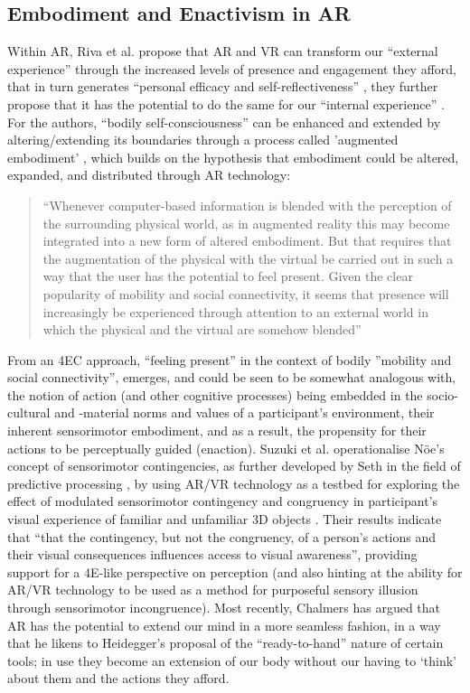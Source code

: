 \subsection{Embodiment and Enactivism in AR}\label{sec: theory-embodimentar}
Within AR, Riva et al. propose that AR and VR can transform our “external experience” through the increased levels of presence and engagement they afford, that in turn generates “personal efficacy and self-reflectiveness” \citeyearpar[p. 10]{riva2016}, they further propose that it has the potential to do the same for our “internal experience” . For the authors, “bodily self-consciousness” can be enhanced and extended by altering/extending its boundaries through a process called ’augmented embodiment’ , which builds on the hypothesis that embodiment could be altered, expanded, and distributed through AR technology: 
\begin{quote}
    “Whenever computer-based information is blended with the perception of the surrounding physical world, as in augmented reality this may become integrated into a new form of altered embodiment. But that requires that the augmentation of the physical with the virtual be carried out in such a way that the user has the potential to feel present. Given the clear popularity of mobility and social connectivity, it seems that presence will increasingly be experienced through attention to an external world in which the physical and the virtual are somehow blended” \citep[]{waterworth2014}
\end{quote}
From an 4EC approach, “feeling present” in the context of bodily ”mobility and social connectivity”, emerges, and could be seen to be somewhat analogous with, the notion of action (and other cognitive processes) being embedded in the  socio-cultural and -material norms and values of a participant’s environment, their inherent sensorimotor embodiment, and as a result, the propensity for their actions to be perceptually guided (enaction). Suzuki et al. operationalise Nöe’s \citeyearpar[]{noe2004} concept of sensorimotor contingencies, as further developed by Seth in the field of predictive processing \citeyearpar[]{seth2014}, by using AR/VR technology as a testbed for exploring the effect of modulated sensorimotor contingency and congruency in participant’s visual experience of familiar and unfamiliar 3D objects \citep[]{suzuki2019}. Their results indicate that “that the contingency, but not the congruency, of a person’s actions and their visual consequences influences access to visual awareness”, providing support for a 4E-like perspective on perception (and also hinting at the ability for AR/VR technology to be used as a method for purposeful sensory illusion through sensorimotor incongruence). Most recently, Chalmers has argued that AR has the potential to extend our mind in a more seamless fashion, in a way that he likens to Heidegger’s proposal of the “ready-to-hand” nature of certain tools; in use they become an extension of our body without our having to ‘think’ about them and the actions they afford.
